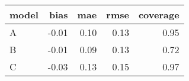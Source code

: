 \begin{table}[ht]
\centering
\begin{tabular}{lrrrr}
  \hline
model & bias & mae & rmse & coverage \\ 
  \hline
A & -0.01 & 0.10 & 0.13 & 0.95 \\ 
  B & -0.01 & 0.09 & 0.13 & 0.72 \\ 
  C & -0.03 & 0.13 & 0.15 & 0.97 \\ 
   \hline
\end{tabular}
\end{table}
